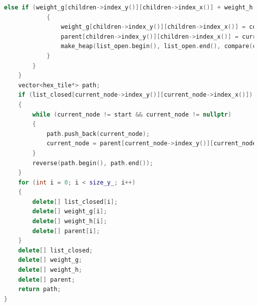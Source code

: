 \documentclass[french]{beamer}
\begin{document}
\begin{frame}
	\tiny
\begin{lstlisting}[language=C++,basicstyle=\ttfamily,keywordstyle=\color{red},breaklines=true]
			else if (weight_g[children->index_y()][children->index_x()] + weight_h[children->index_y()][children->index_x()] > cost_g + weight_h[children->index_y()][children->index_x()])
			{
				weight_g[children->index_y()][children->index_x()] = cost_g;
				parent[children->index_y()][children->index_x()] = current_node;
				make_heap(list_open.begin(), list_open.end(), compare(compare(weight_g, weight_h)));
			}
		}
	}
	vector<hex_tile*> path;
	if (list_closed[current_node->index_y()][current_node->index_x()])
	{
		while (current_node != start && current_node != nullptr)
		{
			path.push_back(current_node);
			current_node = parent[current_node->index_y()][current_node->index_x()];
		}
		reverse(path.begin(), path.end());
	}
	for (int i = 0; i < size_y_; i++)
	{
		delete[] list_closed[i];
		delete[] weight_g[i];
		delete[] weight_h[i];
		delete[] parent[i];
	}
	delete[] list_closed;
	delete[] weight_g;
	delete[] weight_h;
	delete[] parent;
	return path;
}
\end{lstlisting}
\end{frame}
\end{document}
